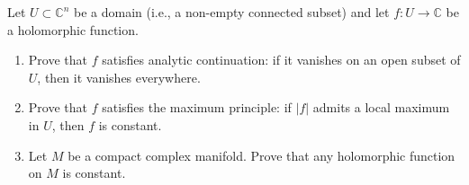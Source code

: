 \documentclass[12pt]{article}
\begin{document}




\begin{problab}{1}
    Let $U \subset \mathbb{C}^n$ be a domain (i.e., a non-empty connected subset) and let $f : U \to \mathbb{C}$ be a holomorphic function.
    \begin{enumerate}
        \item Prove that $f$ satisfies analytic continuation: if it vanishes on an open subset of $U$, then it vanishes everywhere.
        \item Prove that $f$ satisfies the maximum principle: if $|f|$ admits a local maximum in $U$, then $f$ is constant.
        \item Let $M$ be a compact complex manifold. Prove that any holomorphic function on $M$ is constant.
    \end{enumerate}    
\end{problab}
\end{document}
